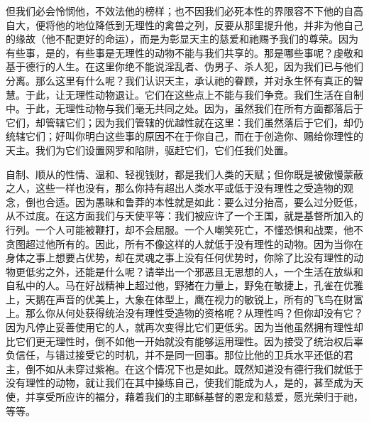 但我们必会怜悯他，不效法他的榜样；也不因我们必死本性的界限容不下他的自高自大，便将他的地位降低到无理性的禽兽之列，反要从那里提升他，并非为他自己的缘故（他不配更好的命运），而是为彰显天主的慈爱和祂赐予我们的尊荣。因为有些事，是的，有些事是无理性的动物不能与我们共享的。那是哪些事呢？虔敬和基于德行的人生。在这里你绝不能说淫乱者、伪男子、杀人犯，因为我们已与他们分离。那么这里有什么呢？我们认识天主，承认祂的眷顾，并对永生怀有真正的智慧。于此，让无理性动物退让。它们在这些点上不能与我们争竞。我们生活在自制中。于此，无理性动物与我们毫无共同之处。因为，虽然我们在所有方面都落后于它们，却管辖它们；因为我们管辖的优越性就在这里：我们虽然落后于它们，却仍统辖它们；好叫你明白这些事的原因不在于你自己，而在于创造你、赐给你理性的天主。我们为它们设置网罗和陷阱，驱赶它们，它们任我们处置。\newline{}\par

自制、顺从的性情、温和、轻视钱财，都是我们人类的天赋；但你既是被傲慢蒙蔽之人，这些一样也没有，那么你持有超出人类水平或低于没有理性之受造物的观念，倒也合适。因为愚昧和鲁莽的本性就是如此：要么过分抬高，要么过分贬低，从不过度。在这方面我们与天使平等：我们被应许了一个王国，就是基督所加入的行列。一个人可能被鞭打，却不会屈服。一个人嘲笑死亡，不懂恐惧和战栗，他不贪图超过他所有的。因此，所有不像这样的人就低于没有理性的动物。因为当你在身体之事上想要占优势，却在灵魂之事上没有任何优势时，你除了比没有理性的动物更低劣之外，还能是什么呢？请举出一个邪恶且无思想的人，一个生活在放纵和自私中的人。马在好战精神上超过他，野猪在力量上，野兔在敏捷上，孔雀在优雅上，天鹅在声音的优美上，大象在体型上，鹰在视力的敏锐上，所有的飞鸟在财富上。那么你从何处获得统治没有理性受造物的资格呢？从理性吗？但你却没有它？因为凡停止妥善使用它的人，就再次变得比它们更低劣。因为当他虽然拥有理性却比它们更无理性时，倒不如他一开始就没有能够运用理性。因为接受了统治权后辜负信任，与错过接受它的时机，并不是同一回事。那位比他的卫兵水平还低的君主，倒不如从未穿过紫袍。在这个情况下也是如此。既然知道没有德行我们就低于没有理性的动物，就让我们在其中操练自己，使我们能成为人，是的，甚至成为天使，并享受所应许的福分，藉着我们的主耶稣基督的恩宠和慈爱，愿光荣归于祂，等等。\par



